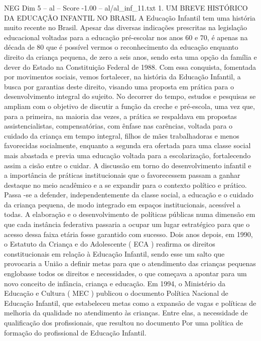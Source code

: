 \begin{textsample}{NEG Dim 5 – al – Score -1.00 – al/al\_inf\_11.txt}  \label{ex:f5_neg_247}
1.
UM BREVE HISTÓRICO DA EDUCAÇÃO INFANTIL NO BRASIL A Educação Infantil tem uma história muito recente no Brasil.
Apesar das diversas indicações prescritas na legislação educacional voltadas para a educação pré-escolar nos anos 60 e 70, é apenas na década de 80 que é possível vermos o reconhecimento da educação enquanto direito da criança pequena, de zero a seis anos, sendo esta uma opção da família e dever do Estado na Constituição Federal de 1988.
Com essa conquista, fomentada por movimentos sociais, vemos fortalecer, na história da Educação Infantil, a busca por garantias deste direito, visando uma proposta em prática para o desenvolvimento integral do sujeito.
No decorrer do tempo, estudos e pesquisas se ampliam com o objetivo de discutir a função da creche e pré-escola, uma vez que, para a primeira, na maioria das vezes, a prática se respaldava em propostas assistencialistas, compensatórias, com ênfase nas carências, voltada para o cuidado da criança em tempo integral, filhos de mães trabalhadoras e menos favorecidas socialmente, enquanto a segunda era ofertada para uma classe social mais abastada e previa uma educação voltada para a escolarização, fortalecendo assim a cisão entre o cuidar.
A discussão em torno do desenvolvimento infantil e a importância de práticas institucionais que o favorecessem passam a ganhar destaque no meio acadêmico e a se expandir para o contexto político e prático.
Passa -se a defender, independentemente da classe social, a educação e o cuidado da criança pequena, de modo integrado em espaços institucionais, acessível a todas.
A elaboração e o desenvolvimento de políticas públicas numa dimensão em que cada instância federativa passaria a ocupar um lugar estratégico para que o acesso dessa faixa etária fosse garantido com sucesso.
Dois anos depois, em 1990, o Estatuto da Criança e do Adolescente ( ECA ) reafirma os direitos constitucionais em relação à Educação Infantil, sendo esse um salto que provocaria a União a definir metas para que o atendimento das crianças pequenas englobasse todos os direitos e necessidades, o que começava a apontar para um novo conceito de infância, criança e educação.
Em 1994, o Ministério da Educação e Cultura ( MEC ) publicou o documento Política Nacional de Educação Infantil, que estabeleceu metas como a expansão de vagas e políticas de melhoria da qualidade no atendimento às crianças.
Entre elas, a necessidade de qualificação dos profissionais, que resultou no documento Por uma política de formação do profissional de Educação Infantil.

\end{textsample}
